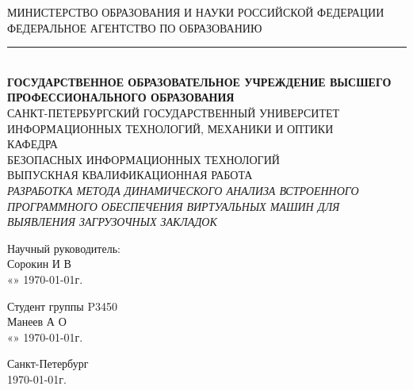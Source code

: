 \begin{titlepage}
	\newpage

	\begin{center}
		\newlength{\HeadLength}
		\settowidth{\HeadLength}{МИНИСТЕРСТВО ОБРАЗОВАНИЯ И НАУКИ РОССИЙСКОЙ ФЕДЕРАЦИИ}
		МИНИСТЕРСТВО ОБРАЗОВАНИЯ И НАУКИ РОССИЙСКОЙ ФЕДЕРАЦИИ\\
		ФЕДЕРАЛЬНОЕ АГЕНТСТВО ПО ОБРАЗОВАНИЮ\\
		\rule{\HeadLength}{0.4mm}\\
		{\fontsize{8pt}{10}
			\selectfont \textbf{ГОСУДАРСТВЕННОЕ ОБРАЗОВАТЕЛЬНОЕ УЧРЕЖДЕНИЕ ВЫСШЕГО ПРОФЕССИОНАЛЬНОГО ОБРАЗОВАНИЯ}\\
		}
		\vspace{1.0cm}
		САНКТ-ПЕТЕРБУРГСКИЙ ГОСУДАРСТВЕННЫЙ УНИВЕРСИТЕТ\\
		ИНФОРМАЦИОННЫХ ТЕХНОЛОГИЙ, МЕХАНИКИ И ОПТИКИ\\
		\vspace{1.5cm}
		КАФЕДРА\\
		БЕЗОПАСНЫХ ИНФОРМАЦИОННЫХ ТЕХНОЛОГИЙ\\
		\vspace{2.5cm}
		\Large{ВЫПУСКНАЯ КВАЛИФИКАЦИОННАЯ РАБОТА}\\
		\vspace{1.0cm}
		\textsc{\textit{
		РАЗРАБОТКА МЕТОДА ДИНАМИЧЕСКОГО АНАЛИЗА ВСТРОЕННОГО ПРОГРАММНОГО ОБЕСПЕЧЕНИЯ ВИРТУАЛЬНЫХ МАШИН ДЛЯ ВЫЯВЛЕНИЯ ЗАГРУЗОЧНЫХ ЗАКЛАДОК
		}}
		\\
	\end{center}

	\vspace{\fill}

	\newlength{\ML}

	\hfill\begin{minipage}{0.45\textwidth}
	Научный руководитель:\\
	\underline{\hspace{\ML}}
	Сорокин И В
	\\
	«\underline{\hspace{0.7cm}}» \underline{\hspace{2cm}} \CurrentYear\today г.
	\end{minipage}%
	\bigskip

	\hfill\begin{minipage}{0.45\textwidth}
	Студент группы 
		P3450
	\\
	\underline{\hspace{\ML}}
		Манеев А О
	\\
	«\underline{\hspace{0.7cm}}» \underline{\hspace{2cm}} \CurrentYear\today г.
	\end{minipage}%

	\vspace{2.5cm}

	\begin{center}
	Санкт-Петербург\\
	\CurrentYear\today г.
	\end{center}

\end{titlepage}
